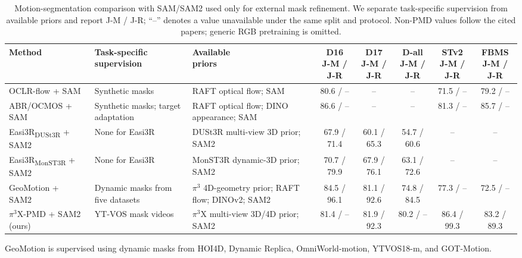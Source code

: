 \begin{table}[t]
\centering
\caption{
Motion-segmentation comparison with SAM/SAM2 used only for external mask
refinement. We separate task-specific supervision from available priors and
report J-M / J-R; ``--'' denotes a value unavailable under the same split and
protocol. Non-PMD values follow the cited papers; generic RGB pretraining is omitted.
}
\label{tab:sota_external_sam_jm_jr}
\scriptsize
\setlength{\tabcolsep}{2.0pt}
\renewcommand{\arraystretch}{1.12}
\begin{tabularx}{\textwidth}{@{}
>{\raggedright\arraybackslash}p{2.12cm}
>{\raggedright\arraybackslash}p{2.25cm}
>{\raggedright\arraybackslash}X
*{5}{c}
@{}}
\toprule
Method
& Task-specific supervision
& \makecell[l]{Available\\priors}
& \makecell{D16\\J-M / J-R}
& \makecell{D17\\J-M / J-R}
& \makecell{D-all\\J-M / J-R}
& \makecell{STv2\\J-M / J-R}
& \makecell{FBMS\\J-M / J-R} \\
\midrule

OCLR-flow + SAM~\citep{oclr,sam}
& Synthetic masks
& RAFT optical flow; SAM
& 80.6 / --
& --
& --
& 71.5 / --
& 79.2 / -- \\

ABR/OCMOS + SAM~\citep{ocmos,sam}
& Synthetic masks; target adaptation
& RAFT optical flow; DINO appearance; SAM
& 86.6 / --
& --
& --
& 81.3 / --
& 85.7 / -- \\

Easi3R\textsubscript{DUSt3R} + SAM2~\citep{easi3r,sam2}
& None for Easi3R
& DUSt3R multi-view 3D prior; SAM2
& 67.9 / 71.4
& 60.1 / 65.3
& 54.7 / 60.6
& --
& -- \\

Easi3R\textsubscript{MonST3R} + SAM2~\citep{easi3r,sam2}
& None for Easi3R
& MonST3R dynamic-3D prior; SAM2
& 70.7 / 79.9
& 67.9 / 76.1
& 63.1 / 72.6
& --
& -- \\

GeoMotion + SAM2~\citep{geomotion,sam2}
& Dynamic masks from five datasets
& $\pi^3$ 4D-geometry prior; RAFT flow; DINOv2; SAM2
& 84.5 / 96.1
& 81.1 / 92.6
& 74.8 / 84.5
& 77.3 / --
& 72.5 / -- \\

\rowcolor{gray!10}
$\pi^3$X-PMD + SAM2 (ours)
& 160 YT-VOS mask videos
& $\pi^3$X multi-view 3D/4D prior; SAM2
& 81.4 / --
& 81.9 / 92.3
& 80.2 / --
& 86.4 / 99.3
& 83.2 / 89.3 \\

\bottomrule
\end{tabularx}
\vspace{2pt}
\parbox{\textwidth}{\scriptsize GeoMotion is supervised using dynamic masks from HOI4D, Dynamic Replica, OmniWorld-motion, YTVOS18-m, and GOT-Motion.}
\end{table}


